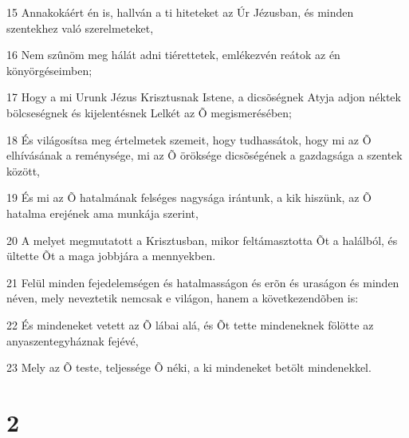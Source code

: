 \par 15 Annakokáért én is, hallván a ti hiteteket az Úr Jézusban, és minden szentekhez való szerelmeteket,
\par 16 Nem szûnöm meg hálát adni tiérettetek, emlékezvén reátok az én könyörgéseimben;
\par 17 Hogy a mi Urunk Jézus Krisztusnak Istene, a dicsõségnek Atyja adjon néktek bölcseségnek és kijelentésnek Lelkét az Õ megismerésében;
\par 18 És világosítsa meg értelmetek szemeit, hogy tudhassátok, hogy mi az Õ elhívásának a reménysége, mi az Õ öröksége dicsõségének a gazdagsága a szentek között,
\par 19 És mi az Õ hatalmának felséges nagysága irántunk, a kik hiszünk, az Õ hatalma erejének ama munkája szerint,
\par 20 A melyet megmutatott a Krisztusban, mikor feltámasztotta Õt a halálból, és ültette Õt a maga jobbjára a mennyekben.
\par 21 Felül minden fejedelemségen és hatalmasságon és erõn és uraságon és minden néven, mely neveztetik nemcsak e világon, hanem a következendõben is:
\par 22 És mindeneket vetett az Õ lábai alá, és Õt tette mindeneknek fölötte az anyaszentegyháznak fejévé,
\par 23 Mely az Õ teste, teljessége Õ néki, a ki mindeneket betölt mindenekkel.

\chapter{2}


